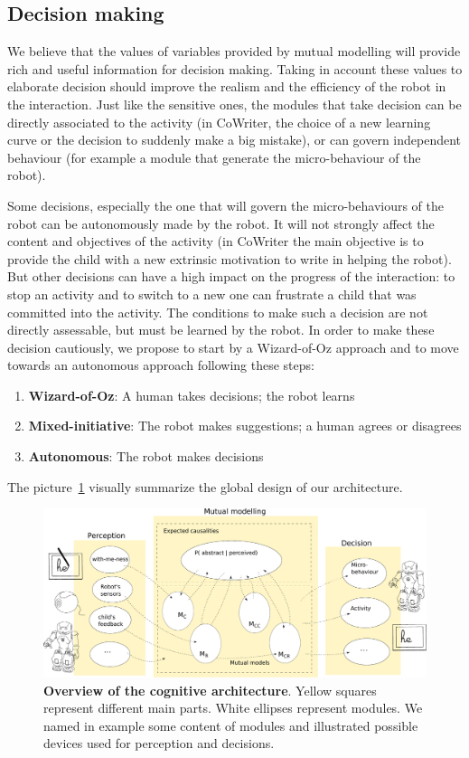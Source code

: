 \documentclass[10pt,a4paper]{article}
\begin{document}
\subsection{Decision making}

We believe that the values of variables provided by mutual modelling will provide rich and useful information for decision making. Taking in account these values to elaborate decision should improve the realism and the efficiency of the robot in the interaction.
Just like the sensitive ones, the modules that take decision can be directly associated to the activity (in CoWriter, the choice of a new learning curve or the decision to suddenly make a big mistake), or can govern independent behaviour (for example a module that generate the micro-behaviour of the robot).

Some decisions, especially the one that will govern the micro-behaviours of the robot can be autonomously made by the robot. It will not strongly affect the content and objectives of the activity (in CoWriter the main objective is to provide the child with a new extrinsic motivation to write in helping the robot). But other decisions can have a high impact on the progress of the interaction: to stop an activity and to switch to a new one can frustrate a child that was committed into the activity. The conditions to make such a decision are not directly assessable, but must be learned by the robot. In order to make these decision cautiously, we propose to start by a Wizard-of-Oz approach and to move towards an autonomous approach following these steps: 
\begin{enumerate}
\item \textbf{Wizard-of-Oz}: A human takes decisions; the robot learns
\item \textbf{Mixed-initiative}: The robot makes suggestions; a human agrees or disagrees
\item \textbf{Autonomous}: The robot makes decisions
\end{enumerate}

The picture~\ref{cog} visually summarize the global design of our architecture. 

\begin{figure}[!]
\centering
\includegraphics[width=1\columnwidth]{cognitive_archi}
\caption{\small\textbf{Overview of the cognitive architecture}. Yellow squares represent different main parts. White ellipses represent modules. We named in example some content of modules and illustrated possible devices used for perception and decisions. }
\label{cog}
\end{figure}
\end{document}

